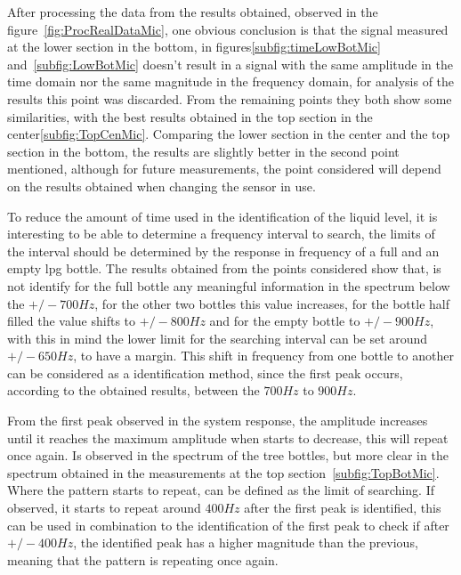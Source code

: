 After processing the data from the results obtained, observed in the figure~\ref{fig:ProcRealDataMic}, one obvious conclusion is that the signal measured at the lower section in the bottom, in figures\ref{subfig:timeLowBotMic} and~\ref{subfig:LowBotMic} doesn't result in a signal with the same amplitude in the time domain nor the same magnitude in the frequency domain, for analysis of the results this point was discarded. From the remaining points they both show some similarities, with the best results obtained in the top section in the center\ref{subfig:TopCenMic}. Comparing the lower section in the center and the top section in the bottom, the results are slightly better in the second point mentioned, although for future measurements, the point considered will depend on the results obtained when changing the sensor in use.

To reduce the amount of time used in the identification of the liquid level, it is interesting to be able to determine a frequency interval to search, the limits of the interval should be determined by the response in frequency of a full and an empty \acrshort{lpg} bottle. The results obtained from the points considered show that, is not identify for the full bottle any meaningful information in the spectrum below the $+/-700Hz$, for the other two bottles this value increases, for the bottle half filled the value shifts to $+/-800Hz$ and for the empty bottle to $+/-900Hz$, with this in mind the lower limit for the searching interval can be set around $+/-650Hz$, to have a margin. This shift in frequency from one bottle to another can be considered as a identification method, since the first peak occurs, according to the obtained results, between the $700Hz$ to $900Hz$.

From the first peak observed in the system response, the amplitude increases until it reaches the maximum amplitude when starts to decrease, this will repeat once again. Is observed in the spectrum of the tree bottles, but more clear in the spectrum obtained in the measurements at the top section~\ref{subfig:TopBotMic}. Where the pattern starts to repeat, can be defined as the limit of searching. If observed, it starts to repeat around $400Hz$ after the first peak is identified, this can be used in combination to the identification of the first peak to check if after $+/-400Hz$, the identified peak has a higher magnitude than the previous, meaning that the pattern is repeating once again.

